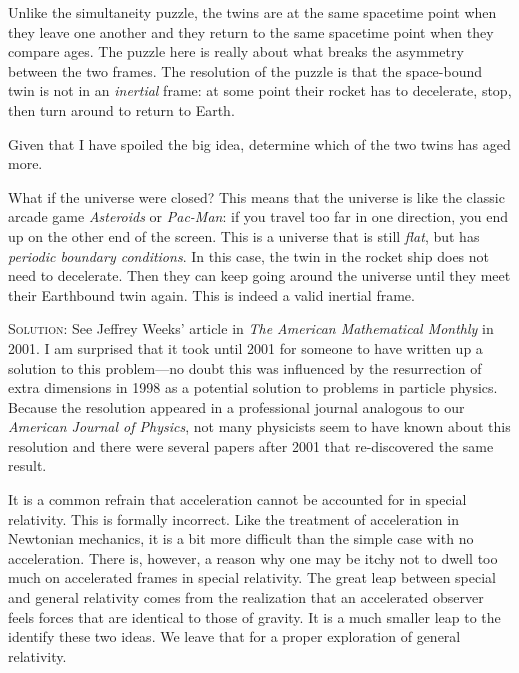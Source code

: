 Unlike the simultaneity puzzle, the twins are at the same spacetime point when they leave one another and they return to the same spacetime point when they compare ages.
The puzzle here is really about what breaks the asymmetry between the two frames. The resolution of the puzzle is that the space-bound twin is not in an \emph{inertial} frame: at some point their rocket has to decelerate, stop, then turn around to return to Earth. 
\begin{exercise}
Given that I have spoiled the big idea, determine which of the two twins has aged more.
\end{exercise}
\begin{exercise}
What if the universe were closed? This means that the universe is like the classic arcade game \emph{Asteroids} or \emph{Pac-Man}: if you travel too far in one direction, you end up on the other end of the screen. This is a universe that is still \emph{flat}, but has \emph{periodic boundary conditions}. In this case, the twin in the rocket ship does not need to decelerate. Then they can keep going around the universe until they meet their Earthbound twin again. This is indeed a valid inertial frame.

\textsc{Solution}: See Jeffrey Weeks' article in \emph{The American Mathematical Monthly} in 2001.\autocite{weeks:twin:doi:10.1080/00029890.2001.11919789} I am surprised that it took until 2001 for someone to have written up a solution to this problem---no doubt this was influenced by the resurrection of extra dimensions in 1998 as a potential solution to problems in particle physics. Because the resolution appeared in a professional journal analogous to our \emph{American Journal of Physics}, not many physicists seem to have known about this resolution and there were several papers after 2001 that re-discovered the same result.
\end{exercise}

It is a common refrain that acceleration cannot be accounted for in special relativity. This is formally incorrect. Like the treatment of acceleration in Newtonian mechanics, it is a bit more difficult than the simple case with no acceleration. There is, however, a reason why one may be itchy not to dwell too much on accelerated frames in special relativity. The great leap between special and general relativity comes from the realization that an accelerated observer feels forces that are identical to those of gravity. It is a much smaller leap to the identify these two ideas. We leave that for a proper exploration of general relativity.



